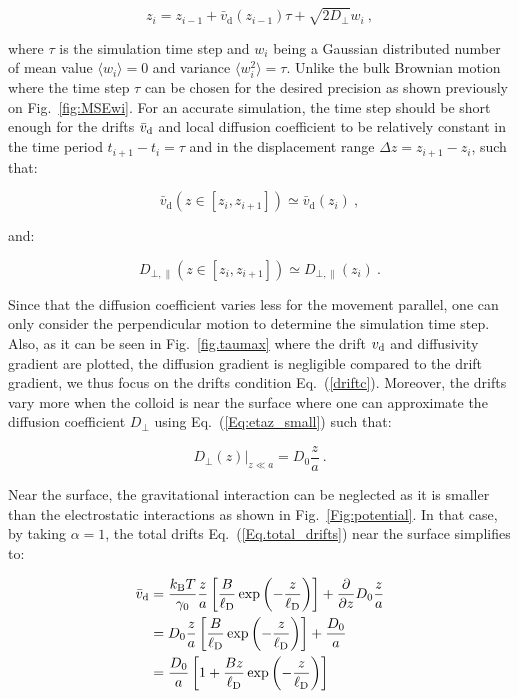 \begin{equation}
	z_i = z_{i-1} + \bar{v}_\mathrm{d}(z_{i-1}) \tau + \sqrt{2D_\bot}w_i ~,
\end{equation}

where $\tau$ is the simulation time step and $w_i$ being a Gaussian distributed number of mean value $\langle w_i \rangle = 0$ and variance $\langle w_i ^2\rangle = \tau$. Unlike the bulk Brownian motion where the time step $\tau$ can be chosen for the desired precision as shown previously on Fig.~\ref{fig:MSEwi}. For an accurate simulation, the time step should be short enough for the drifts $\bar{v}_\textnormal{d}$ and local diffusion coefficient to be relatively constant in the time period $t_{i+1} - t_i = \tau$ and in the displacement range $\Delta z = z_{i+1} - z_i$, such that:

\begin{equation}
	\bar{v}_\mathrm{d} (z \in [z_i, z_{i+1}]) \simeq \bar{v}_\mathrm{d} (z_i) ~,
	\label{driftc}
\end{equation}

and:

\begin{equation}
	D_{\bot, \parallel}(z \in [z_i, z_{i+1}]) \simeq D_{\bot, \parallel}(z_i) ~.
\end{equation}

Since that the diffusion coefficient varies less for the movement parallel, one can only consider the perpendicular motion to determine the simulation time step. Also, as it can be seen in Fig.~\ref{fig.taumax} where the drift $v_\textnormal{d}$ and diffusivity gradient are plotted, the diffusion gradient is negligible compared to the drift gradient, we thus focus on the drifts condition Eq.~(\ref{driftc}). Moreover, the drifts vary more when the colloid is near the surface where one can approximate the diffusion coefficient $D_\bot$ using Eq.~(\ref{Eq:etaz_small}) such that:

\begin{equation}
	\left.D_\bot  (z)\right|_{z\ll a} = D_ 0 \frac{z}{a} ~.
\end{equation}

Near the surface, the gravitational interaction can be neglected as it is smaller than the electrostatic interactions as shown in Fig.~\ref{Fig:potential}. In that case, by taking $\alpha = 1$, the total drifts Eq.~(\ref{Eq.total_drifts}) near the surface simplifies to:

\begin{equation}
	\begin{aligned}
		\bar{v}_\textnormal{d} &=  \frac{k_\mathrm{B}T}{\gamma_0} \frac{z}{a} \left[\frac{B}{\ell_\mathrm{D}} \exp \left(-\frac{z}{\ell_\mathrm{D}}\right)\right] + \frac{\partial}{\partial z} D_0 \frac{z}{a} \\
		&= D_0 \frac{z}{a} \left[\frac{B}{\ell_\mathrm{D}} \exp \left(-\frac{z}{\ell_\mathrm{D}}\right)\right] + \frac{D_0}{a} \\
		&= \frac{D_0}{a} \left[ 1 + \frac{Bz}{\ell_\mathrm{D}} \exp \left(-\frac{z}{\ell_\mathrm{D}}\right)\right]
	\end{aligned}
\end{equation}

